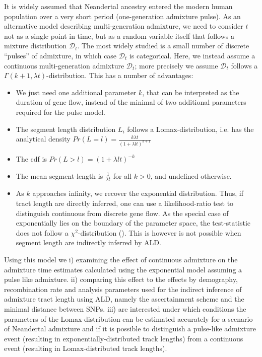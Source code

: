 \documentclass[]{article}
\begin{document}
It is widely assumed that Neandertal ancestry entered the modern human
population over a very short period (one-generation admixture pulse). As an alternative model describing multi-generation admixture, we need to
consider \(t\) not as a single point in time, but as a random variable
itself that follows a mixture distribution \(\mathcal{D}_t\). The most
widely studied is a small number of discrete ``pulses'' of admixture, in
which case \(\mathcal{D}_t\) is categorical. Here, we instead assume a
continuous multi-generation admixture \(\mathcal{D}_t\); more precisely we assume \(\mathcal{D}_t\)
follows a \(\Gamma(k+1, \lambda t)\)-distribution. This has a number of
advantages:

\begin{itemize}
    \item We just need one additional parameter $k$, that can be interpreted as the duration of gene flow, instead of the minimal of two additional parameters required for the pulse model.
    \item The segment length distribution $L_i$ follows a Lomax-distribution, i.e. has the analytical density $Pr(L=l) = \frac{k \lambda t}{(1 + \lambda l t)^{k+1}}$
    \item The cdf is $Pr(L > l) = (1+\lambda l t )^{-k}$
    \item The mean segment-length is  $\frac{1}{\lambda t}$ for all $k > 0$, and undefined otherwise. 
    \item As $k$ approaches infinity, we recover the exponential distribution. Thus, if tract length are directly inferred, one can use a likelihood-ratio test to distinguish continuous from discrete gene flow. As the special case of exponentially lies on the boundary of the parameter space, the test-statistic does not follow a $\chi^2$-distribution (\cite{Kozubowski_Testing_2008}). This is however is not possible when segment length are indirectly inferred by ALD.
\end{itemize}

Using this model we i) examining the effect of continuous admixture on
the admixture time estimates calculated using the exponential model
assuming a pulse like admixture. ii) comparing this effect to the
effects by demography, recombination rate and analysis parameters used
for the indirect inference of admixture tract length using ALD, namely
the ascertainment scheme and the minimal distance between SNPs. iii) are
interested under which conditions the parameters of the
Lomax-distribution can be estimated accurately for a scenario of
Neandertal admixture and if it is possible to distinguish a pulse-like
admixture event (resulting in exponentially-distributed track lengths)
from a continuous event (resulting in Lomax-distributed track lengths).
\end{document}

